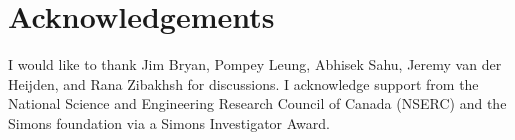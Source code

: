 \documentclass[12pt]{article}
\theoremstyle{definition}
\begin{document}
\section*{Acknowledgements}

I would like to thank Jim Bryan, Pompey Leung, Abhisek Sahu, Jeremy van der Heijden, and Rana Zibakhsh for discussions.
I acknowledge support from the National Science and Engineering Research Council of Canada
(NSERC) and the Simons foundation via a Simons Investigator Award. 



\end{document}
